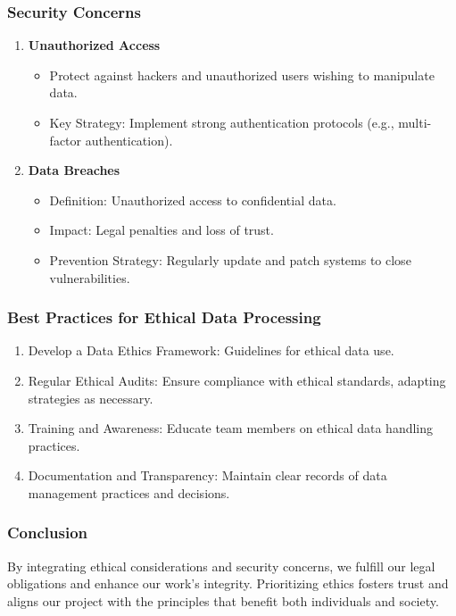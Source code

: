 \documentclass[aspectratio=169]{beamer}
\begin{document}
\begin{frame}[fragile]
    \frametitle{Security Concerns}
    \begin{enumerate}
        \item \textbf{Unauthorized Access}
            \begin{itemize}
                \item Protect against hackers and unauthorized users wishing to manipulate data.
                \item Key Strategy: Implement strong authentication protocols (e.g., multi-factor authentication).
            \end{itemize}
        \item \textbf{Data Breaches}
            \begin{itemize}
                \item Definition: Unauthorized access to confidential data.
                \item Impact: Legal penalties and loss of trust.
                \item Prevention Strategy: Regularly update and patch systems to close vulnerabilities.
            \end{itemize}
    \end{enumerate}
\end{frame}

\begin{frame}[fragile]
    \frametitle{Best Practices for Ethical Data Processing}
    \begin{enumerate}
        \item Develop a Data Ethics Framework: Guidelines for ethical data use.
        \item Regular Ethical Audits: Ensure compliance with ethical standards, adapting strategies as necessary.
        \item Training and Awareness: Educate team members on ethical data handling practices.
        \item Documentation and Transparency: Maintain clear records of data management practices and decisions.
    \end{enumerate}
\end{frame}

\begin{frame}[fragile]
    \frametitle{Conclusion}
    By integrating ethical considerations and security concerns, we fulfill our legal obligations and enhance our work's integrity. Prioritizing ethics fosters trust and aligns our project with the principles that benefit both individuals and society.
\end{frame}
\end{document}
